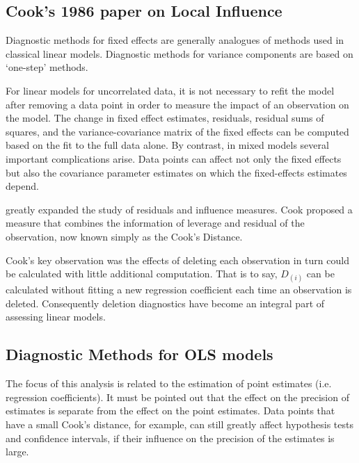 \documentclass[12pt, a4paper]{report}
\theoremstyle{plain}
\theoremstyle{definition}
\theoremstyle{remark}
\begin{document}
\subsection{Cook's 1986 paper on Local Influence}%

Diagnostic methods for fixed effects are generally analogues of methods used in classical linear models. Diagnostic methods for variance components are based on `one-step' methods.

For linear models for uncorrelated data, it is not necessary to refit the model after removing a data point in order to measure the impact of an observation on the model. The change in fixed effect estimates, residuals, residual sums of squares, and the variance-covariance matrix of the fixed effects can be computed based on the fit to the full data alone. By contrast, in mixed models several important complications arise. Data points can affect not only the fixed effects but also the covariance parameter estimates on which the fixed-effects estimates depend. 


\citet{cook77} greatly expanded the study of residuals and influence measures.  Cook proposed a measure that combines the information of leverage and residual of the observation, now known simply as the Cook's Distance. 

Cook's key observation was the effects of deleting each observation in turn could be calculated with little additional computation. That is to say, $D_{(i)}$ can be calculated without fitting a new regression coefficient each time an observation is deleted. Consequently deletion diagnostics have become an integral part of assessing linear models. 

\subsection{Diagnostic Methods for OLS models}


The focus of this analysis is related to the estimation of point estimates (i.e. regression coefficients). It must be pointed out that the effect on the precision of estimates is separate from the effect on the point estimates. Data points that
have a small Cook's distance, for example, can still greatly affect hypothesis tests and confidence intervals, if their  influence on the precision of the estimates is large.
\end{document}
